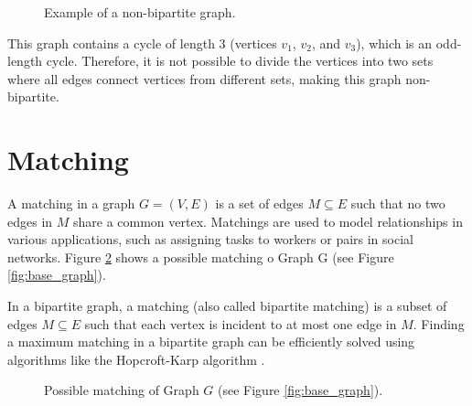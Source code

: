        \begin{figure}[!ht]
            \centering
            \caption{Example of a non-bipartite graph.} 
            \label{fig:non_bipartite_graph}
        \end{figure}
        
        This graph contains a cycle of length 3 (vertices \(v_1\), \(v_2\), and \(v_3\)), which is an odd-length cycle. Therefore, it is not possible to divide the vertices into two sets where all edges connect vertices from different sets, making this graph non-bipartite.
        


        \section{Matching}

            A matching in a graph \( G = (V, E) \) is a set of edges \( M \subseteq E \) such that no two edges in \( M \) share a common vertex. Matchings are used to model relationships in various applications, such as assigning tasks to workers or pairs in social networks. Figure \ref{fig:possible_matching} shows a possible matching o Graph G (see Figure \ref{fig:base_graph}).
            
            In a bipartite graph, a matching (also called bipartite matching) is a subset of edges \( M \subseteq E \) such that each vertex is incident to at most one edge in \( M \). Finding a maximum matching in a bipartite graph can be efficiently solved using algorithms like the Hopcroft-Karp algorithm \cite{west2001introduction, diestel2017graph}.


            \begin{figure}[!ht]
                \centering
                \caption{Possible matching of Graph $G$ (see Figure \ref{fig:base_graph}).}
                \label{fig:possible_matching}
            \end{figure}
            
